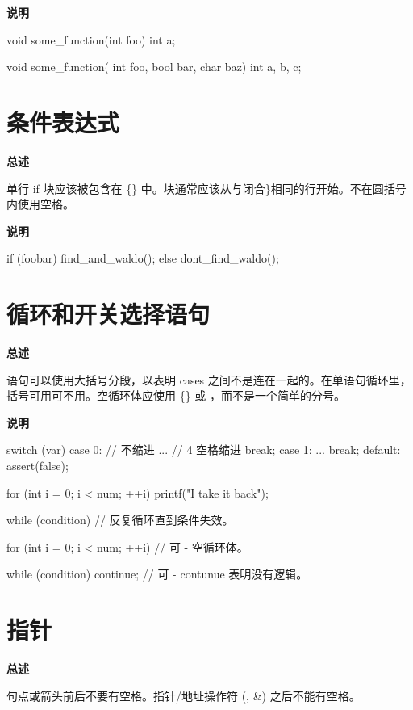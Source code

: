 \textbf{说明}

\begin{ccode}
void some_function(int foo) {
    int a;
}

void some_function(
        int foo,
        bool bar,
        char baz) {
    int a, b, c;
}
\end{ccode}

\section{条件表达式}

\textbf{总述}

单行 if 块应该被包含在 \{\} 中。块通常应该从与闭合\}相同的行开始。不在圆括号内使用空格。

\textbf{说明}

\begin{ccode}
if (foobar) {
    find_and_waldo();
} else {
    dont_find_waldo();
}
\end{ccode}

\section{循环和开关选择语句}

\textbf{总述}

语句可以使用大括号分段，以表明 cases 之间不是连在一起的。在单语句循环里，括号可用可不用。空循环体应使用 \{\} 或 ，而不是一个简单的分号。

\textbf{说明}

\begin{ccode}
switch (var) {
case 0: {     // 不缩进
    ...       // 4 空格缩进
    break;
}
case 1: {
    ...
    break;
}
default: {
    assert(false);
}
}

for (int i = 0; i < num; ++i) {
  printf("I take it back\n");
}

while (condition) {
  // 反复循环直到条件失效。
}

for (int i = 0; i < num; ++i) {}  // 可 - 空循环体。

while (condition) continue;  // 可 - contunue 表明没有逻辑。
\end{ccode}

\section{指针}

\textbf{总述}

句点或箭头前后不要有空格。指针/地址操作符 (\*, \&) 之后不能有空格。

